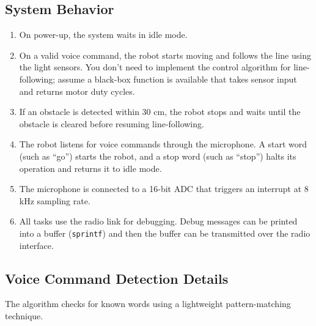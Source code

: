 \vspace*{-1.5em}
\subsection*{System Behavior}
\vspace*{-0.5em}

\begin{enumerate}[topsep=0pt]
      \item On power-up, the system waits in idle mode.

      \item On a valid voice command, the robot starts moving and follows the line using the light sensors.
            You don't need to implement the control algorithm for line-following; assume a black-box function is available that takes sensor input and returns motor duty cycles.

      \item If an obstacle is detected within 30 cm, the robot stops and waits until the obstacle is cleared before resuming line-following.

      \item The robot listens for voice commands through the microphone.
            A start word (such as ``go'') starts the robot, and a stop word (such as ``stop'') halts its operation and returns it to idle mode.

      \item The microphone is connected to a 16-bit ADC that triggers an interrupt at 8 kHz sampling rate.

      \item All tasks use the radio link for debugging.
            Debug messages can be printed into a buffer (\texttt{sprintf}) and then the buffer can be transmitted over the radio interface.
\end{enumerate}

\vspace*{-1.5em}
\subsection*{Voice Command Detection Details}
\vspace*{-0.5em}

The algorithm checks for known words using a lightweight pattern-matching technique.

